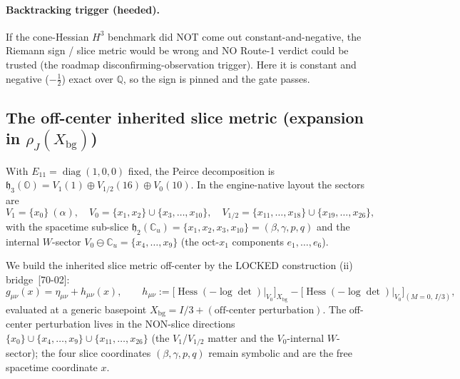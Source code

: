 \paragraph{Backtracking trigger (heeded).}
If the cone-Hessian $H^3$ benchmark did NOT come out constant-and-negative, the
Riemann sign / slice metric would be wrong and NO Route-1 verdict could be trusted
(the roadmap disconfirming-observation trigger). Here it is constant and negative
($-\tfrac12$) exact over $\mathbb{Q}$, so the sign is pinned and the gate passes.

\subsection{The off-center inherited slice metric (expansion in
  $\rho_J(X_{\mathrm{bg}})$)}
\label{sec:offcenter}

With $E_{11}=\operatorname{diag}(1,0,0)$ fixed, the Peirce decomposition is
$\mathfrak{h}_3(\mathbb{O}) = V_1(1)\oplus V_{1/2}(16)\oplus V_0(10)$. In the
engine-native layout the sectors are
\begin{equation}
  V_1 = \{x_0\}\ (\alpha),\quad
  V_0 = \{x_1,x_2\}\cup\{x_3,\dots,x_{10}\},\quad
  V_{1/2} = \{x_{11},\dots,x_{18}\}\cup\{x_{19},\dots,x_{26}\},
  \label{eq:peirce-idx}
\end{equation}
with the spacetime sub-slice
$\mathfrak{h}_2(\mathbb{C}_u)=\{x_1,x_2,x_3,x_{10}\}=(\beta,\gamma,p,q)$ and the
internal $W$-sector $V_0\ominus\mathbb{C}_u=\{x_4,\dots,x_9\}$ (the oct-$x_1$
components $e_1,\dots,e_6$).

We build the inherited slice metric off-center by the LOCKED construction (ii)
bridge~[70-02]:
\begin{equation}
  g_{\mu\nu}(x) = \eta_{\mu\nu} + h_{\mu\nu}(x),
  \qquad
  h_{\mu\nu} := \big[\operatorname{Hess}(-\log\det)\big|_{V_0}\big]_{X_{\mathrm{bg}}}
              - \big[\operatorname{Hess}(-\log\det)\big|_{V_0}\big]_{(M=0,\,I/3)},
  \label{eq:offcenter-bridge}
\end{equation}
evaluated at a generic basepoint $X_{\mathrm{bg}} = I/3 + (\text{off-center
perturbation})$. The off-center perturbation lives in the NON-slice directions
$\{x_0\}\cup\{x_4,\dots,x_9\}\cup\{x_{11},\dots,x_{26}\}$ (the $V_1$/$V_{1/2}$
matter and the $V_0$-internal $W$-sector); the four slice coordinates
$(\beta,\gamma,p,q)$ remain symbolic and are the free spacetime coordinate $x$.


